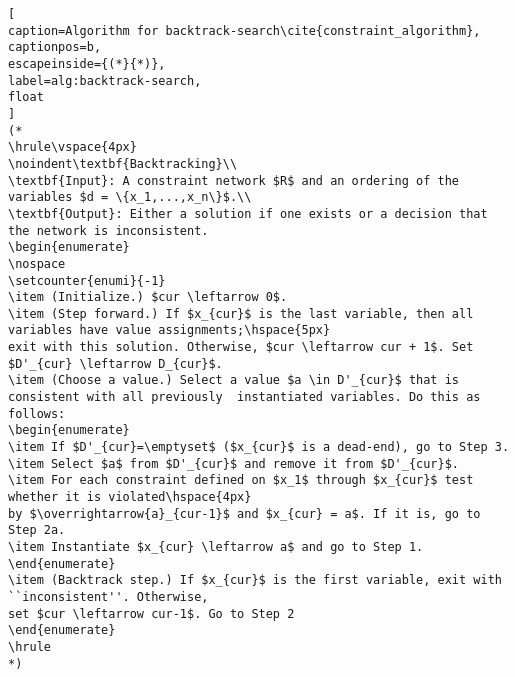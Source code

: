 \begin{lstlisting}[
caption=Algorithm for backtrack-search\cite{constraint_algorithm}, 
captionpos=b, 
escapeinside={(*}{*)}, 
label=alg:backtrack-search,
float
]
(*
\hrule\vspace{4px}
\noindent\textbf{Backtracking}\\
\textbf{Input}: A constraint network $R$ and an ordering of the variables $d = \{x_1,...,x_n\}$.\\
\textbf{Output}: Either a solution if one exists or a decision that the network is inconsistent.
\begin{enumerate}
\nospace
\setcounter{enumi}{-1}
\item (Initialize.) $cur \leftarrow 0$.
\item (Step forward.) If $x_{cur}$ is the last variable, then all variables have value assignments;\hspace{5px}
exit with this solution. Otherwise, $cur \leftarrow cur + 1$. Set $D'_{cur} \leftarrow D_{cur}$.
\item (Choose a value.) Select a value $a \in D'_{cur}$ that is consistent with all previously  instantiated variables. Do this as follows:
\begin{enumerate} 
\item If $D'_{cur}=\emptyset$ ($x_{cur}$ is a dead-end), go to Step 3.
\item Select $a$ from $D'_{cur}$ and remove it from $D'_{cur}$.
\item For each constraint defined on $x_1$ through $x_{cur}$ test whether it is violated\hspace{4px}
by $\overrightarrow{a}_{cur-1}$ and $x_{cur} = a$. If it is, go to Step 2a.
\item Instantiate $x_{cur} \leftarrow a$ and go to Step 1.
\end{enumerate}
\item (Backtrack step.) If $x_{cur}$ is the first variable, exit with ``inconsistent''. Otherwise,
set $cur \leftarrow cur-1$. Go to Step 2
\end{enumerate}
\hrule
*)
\end{lstlisting}